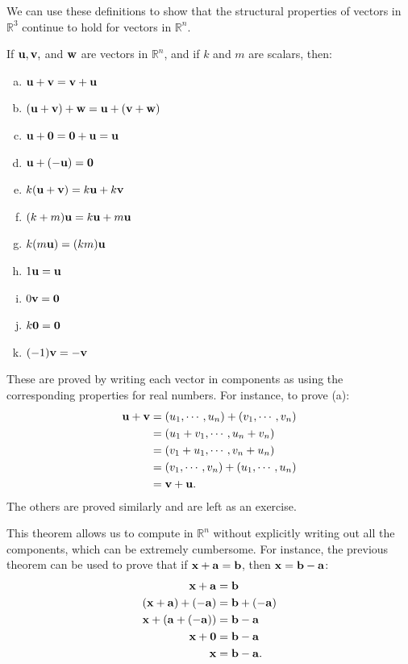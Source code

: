 \documentclass[12pt,letterpaper,reqno]{article}
\numberwithin{equation}{section}
\begin{document}
We can use these definitions to show that the structural properties of vectors in $\mathbb{R}^3$ continue to hold for vectors in $\mathbb{R}^n$.

\begin{thm}
If ${\bf u}, {\bf v},$ and ${\bf w}$ are vectors in $\mathbb{R}^n$, and if $k$ and $m$ are scalars, then:
	\begin{enumerate}[(a)]
		\item ${\bf u}+{\bf v}={\bf v}+{\bf u}$
		\item $({\bf u}+{\bf v})+{\bf w}={\bf u}+({\bf v}+{\bf w})$
		\item ${\bf u}+{\bf 0}={\bf 0}+{\bf u}={\bf u}$
		\item ${\bf u}+(-{\bf u})={\bf 0}$
		\item $k({\bf u}+{\bf v})=k{\bf u}+k{\bf v}$
		\item $(k+m){\bf u}=k{\bf u}+m{\bf u}$
		\item $k(m{\bf u})=(km){\bf u}$
		\item $1{\bf u}={\bf u}$
		\item $0{\bf v}={\bf 0}$
		\item $k{\bf 0}={\bf 0}$
		\item $(-1){\bf v}=-{\bf v}$
	\end{enumerate}
\end{thm}

\begin{pf}
These are proved by writing each vector in components as using the corresponding properties for real numbers. For instance, to prove (a):
\begin{align*}
	{\bf u}+{\bf v}&=(u_1,\cdots,u_n)+(v_1,\cdots,v_n) \\
	&=(u_1+v_1, \cdots, u_n+v_n) \\
	&=(v_1+u_1, \cdots, v_n+u_n) \\ 
	&=(v_1,\cdots,v_n)+(u_1,\cdots,u_n) \\
	&={\bf v}+{\bf u}.
\end{align*}	
The others are proved similarly and are left as an exercise.
\end{pf}

This theorem allows us to compute in $\mathbb{R}^n$ without explicitly writing out all the components, which can be extremely cumbersome. For instance, the previous theorem can be used to prove that if ${\bf x}+{\bf a}={\bf b}$, then ${\bf x}={\bf b}-{\bf a}$:
\begin{align*}
	{\bf x}+{\bf a}&={\bf b} \\
	({\bf x}+{\bf a})+(-{\bf a})&={\bf b}+(-{\bf a}) \\
	{\bf x}+({\bf a}+(-{\bf a}))&={\bf b}-{\bf a} \\
	{\bf x}+{\bf 0}&={\bf b}-{\bf a} \\
	{\bf x}&={\bf b}-{\bf a}.
\end{align*}
\end{document}
